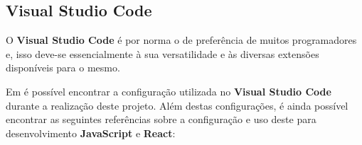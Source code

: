 \subsection{Visual Studio Code}

\begin{minipage}{.3\textwidth}
\end{minipage}
\begin{minipage}{.7\textwidth}
	\minipagerestore
	O \textbf{Visual Studio Code} é por norma o  de preferência de muitos programadores e, isso deve-se essencialmente à sua versatilidade e às diversas extensões disponíveis para o mesmo.

	Em  é possível encontrar a configuração utilizada no \textbf{Visual Studio Code} durante a realização deste projeto. Além destas configurações, é ainda possível encontrar as seguintes referências sobre a configuração e uso deste  para desenvolvimento \textbf{JavaScript} e \textbf{React}: \cite{ultimateVSReact,reactToolsVS,spVSExtensions,vscodeReactSP}
\end{minipage}